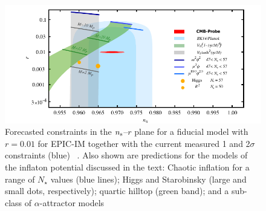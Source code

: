 \begin{figure}[ht!]
\hspace{-0.2in}
\parbox{4.in}{\centerline {
\includegraphics[width=4.5in]{figs/nsrlabeledrp01v1} } }
\hspace{-0.05in}
\parbox{2.5in}{
\caption{ \small \setlength{\baselineskip}{0.95\baselineskip}
Forecasted constraints in the $n_{\rm s}$--$r$ plane for a fiducial model with $r=0.01$ for EPIC-IM together 
with the current measured 1 and 2$\sigma$ constraints (blue) ~\cite{Array:2015xqh}. Also shown are predictions 
for the models of the inflaton potential discussed in the text: Chaotic inflation for a range of $N_\star$ values (blue lines); 
Higgs and Starobinsky (large and small dots, respectively);  quartic hilltop (green band); and a sub-class of $\alpha$-attractor
models~\cite{Kallosh:2013hoa}
\label{fig:clall} } }
\vspace{-0.1in}
\end{figure}

